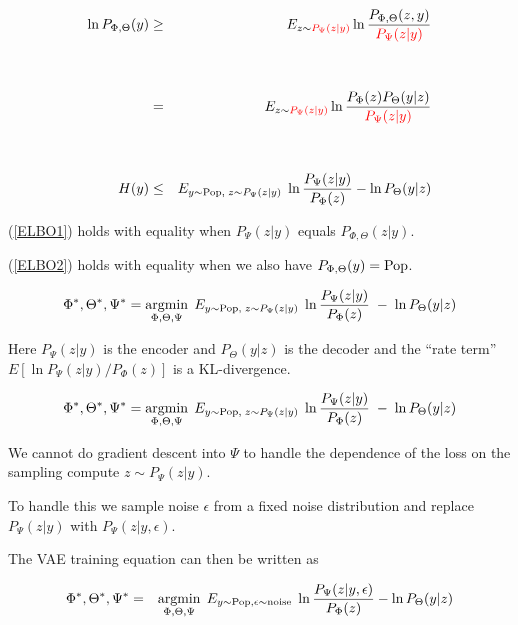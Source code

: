 {

{\huge
\begin{eqnarray}
\ln P_{\Phi,\Theta}(y)   &  \geq & E_{z \sim {\color{red} P_\Psi(z|y)}} \ln \frac{P_{\Phi,\Theta}(z,y)}{{\color{red} P_\Psi(z|y)}} \label{ELBO1} \\
  \nonumber  \\
  \nonumber \\
  & = & E_{z \sim {\color{red} P_\Psi(z|y)}} \ln \frac{P_\Phi(z)P_\Theta(y|z)}{{\color{red} P_\Psi(z|y)}} \nonumber \\
  \nonumber \\
  \nonumber \\
  H(y) & \leq & E_{y \sim \mathrm{Pop},\;z \sim P_\Psi(z|y)}\;\ln\frac{P_\Psi(z|y)}{P_\Phi(z)} - \ln P_\Theta(y|z)
  \label{ELBO2}
\end{eqnarray}

\vfill
(\ref{ELBO1}) holds with equality when $P_\Psi(z|y)$ equals $P_{\Phi,\Theta}(z|y)$.

\vfill
(\ref{ELBO2}) holds with equality when we also have $P_{\Phi,\Theta}(y) = \mathrm{Pop}$.
}


$$\Phi^*,\Theta^*,\Psi^* = \operatorname*{argmin}_{\Phi,\Theta,\Psi}\;E_{y \sim \mathrm{Pop},\;z \sim P_\Psi(z|y)}\;\ln\frac{P_\Psi(z|y)}{P_\Phi(z)} \;-\; \ln P_\Theta(y|z)$$

\vfill
Here $P_\Psi(z|y)$ is the encoder and $P_\Theta(y|z)$ is the decoder and the ``rate term'' $ E\left[\ln P_\Psi(z|y)/P_\Phi(z)\right]$ is a KL-divergence.


$$\Phi^*,\Theta^*,\Psi^* = \operatorname*{argmin}_{\Phi,\Theta,\Psi}\;E_{y \sim \mathrm{Pop},\;z \sim P_\Psi(z|y)}\;\ln\frac{P_\Psi(z|y)}{P_\Phi(z)} \;-\; \ln P_\Theta(y|z)$$

\vfill
We cannot do gradient descent into $\Psi$ to handle the dependence of the loss on the sampling compute $z \sim P_\Psi(z|y)$.

\vfill
To handle this we sample noise $\epsilon$ from a fixed noise distribution and replace $P_\Psi(z|y)$ with $P_\Psi(z|y,\epsilon)$.

\vfill
The VAE training equation can then be written as

\vfill
\begin{eqnarray*}
\Phi^*,\Theta^*,\Psi^* & =  & \operatorname*{argmin}_{\Phi,\Theta,\Psi}\;E_{y\sim\mathrm{Pop},\epsilon\sim\mathrm{noise}}  \;\ln \frac{P_\Psi(z|y,\epsilon)}{P_\Phi(z)}  - \ln P_\Theta(y|z)
\end{eqnarray*}


}
